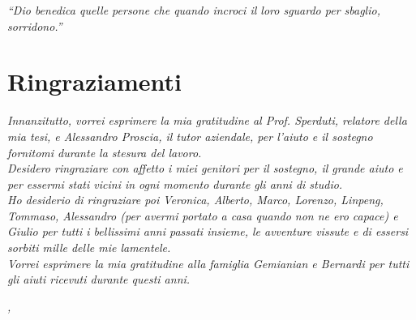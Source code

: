 
\cleardoublepage
{}
{}
\begin{flushright}{
	\slshape
	``Dio benedica quelle persone che quando incroci il loro sguardo per sbaglio, sorridono.''} \\
	\medskip
\end{flushright}


\bigskip

\begingroup
\let\clearpage\relax
\let\cleardoublepage\relax
\let\cleardoublepage\relax

\chapter*{Ringraziamenti}

\noindent \textit{Innanzitutto, vorrei esprimere la mia gratitudine al Prof. Sperduti, relatore della mia tesi, e Alessandro Proscia, il tutor aziendale, per l'aiuto e il sostegno fornitomi durante la stesura del lavoro.}\\

\noindent \textit{Desidero ringraziare con affetto i miei genitori per il sostegno, il grande aiuto e per essermi stati vicini in ogni momento durante gli anni di studio.}\\

\noindent \textit{Ho desiderio di ringraziare poi Veronica, Alberto, Marco, Lorenzo, Linpeng, Tommaso, Alessandro (per avermi portato a casa quando non ne ero capace) e Giulio per tutti i bellissimi anni passati insieme, le avventure vissute e di essersi sorbiti mille delle mie lamentele.}\\

\noindent \textit{Vorrei esprimere la mia gratitudine alla famiglia Gemianian e Bernardi per tutti gli aiuti ricevuti durante questi anni.}\\
\bigskip

\noindent\textit{\myLocation, \myTime}
\hfill \myName

\endgroup

